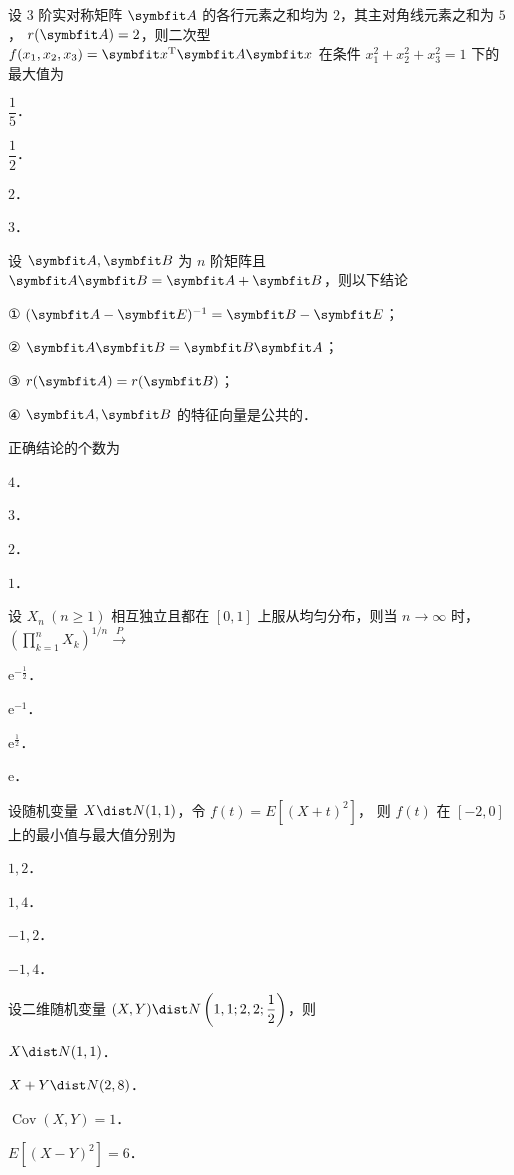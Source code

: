 \begin{question}[index=6]
设 $3$ 阶实对称矩阵 $\symbfit A$ 的各行元素之和均为 $2$，其主对角线元素之和为 $5$，
$r(\symbfit A)=2$，则二次型 $f(x_1,x_2,x_3)=\symbfit x^{\mathrm T}\symbfit A\symbfit x$
在条件 $x_1^2+x_2^2+x_3^2=1$ 下的最大值为
\begin{choices}[columns=4,label-pos=left]
\item $\dfrac15$．
\item $\dfrac12$．
\item $2$．
\item $3$．
\end{choices}
\end{question}
\QuestionBreak

\begin{question}[index=7]
设 $\symbfit A,\symbfit B$ 为 $n$ 阶矩阵且 $\symbfit A\symbfit B=\symbfit A+\symbfit B$，则以下结论\par
① $(\symbfit A-\symbfit E)^{-1}=\symbfit B-\symbfit E$；\par
② $\symbfit A\symbfit B=\symbfit B\symbfit A$；\par
③ $r(\symbfit A)=r(\symbfit B)$；\par
④ $\symbfit A,\symbfit B$ 的特征向量是公共的．\par
正确结论的个数为
\begin{choices}[columns=4]
\item $4$．
\item $3$．
\item $2$．
\item $1$．
\end{choices}
\end{question}
\QuestionBreak

\begin{question}[index=8]
设 $X_n\ (n\ge1)$ 相互独立且都在 $[0,1]$ 上服从均匀分布，则当 $n\to\infty$ 时，
$\displaystyle \left(\prod_{k=1}^n X_k\right)^{1/n}\xrightarrow{P}$
\begin{choices}[columns=4]
\item $\mathrm e^{-\frac12}$．
\item $\mathrm e^{-1}$．
\item $\mathrm e^{\frac12}$．
\item $\mathrm e$．
\end{choices}
\end{question}
\QuestionBreak

\begin{question}[index=9]
设随机变量 $X\dist N(1,1)$，令 $f(t)=E[(X+t)^2]$，
则 $f(t)$ 在 $[-2,0]$ 上的最小值与最大值分别为
\begin{choices}[columns=4]
\item $1,2$．
\item $1,4$．
\item $-1,2$．
\item $-1,4$．
\end{choices}
\end{question}
\QuestionBreak

\begin{question}[index=10]
设二维随机变量 $\displaystyle (X,Y)\dist N\left(1,1;2,2;\frac12\right)$，则
\begin{choices}[columns=2]
\item $X\dist N(1,1)$．
\item $X+Y\dist N(2,8)$．
\item $\operatorname{Cov}(X,Y)=1$．
\item $E[(X-Y)^2]=6$．
\end{choices}
\end{question}
